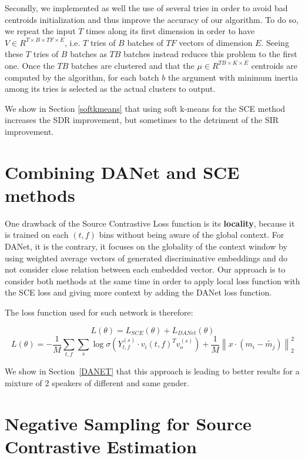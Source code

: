 \documentclass[master,final,11pt]{iscs-thesis}
\newcommand{\norm}[1]{\left\lVert#1\right\rVert}
\begin{document}
Secondly, we implemented as well the use of several tries in order to avoid bad centroids initialization and thus improve the accuracy of our algorithm. To do so, we repeat the input $T$ times along its first dimension in order to have $V\in R^{T \times B\times TF \times E}$, i.e. $T$ tries of $B$ batches of $TF$ vectors of dimension $E$. Seeing these $T$ tries of $B$ batches as $TB$ batches instead reduces this problem to the first one. Once the $TB$ batches are clustered and that the $\mu \in R^{TB\times K \times E}$ centroids are computed by the algorithm, for each batch $b$ the argument with minimum inertia among its tries is selected as the actual clusters to output.

We show in Section \ref{softkmeans} that using soft k-means for the SCE method increases the SDR improvement, but sometimes to the detriment of the SIR improvement.



\section{Combining DANet and SCE methods}

One drawback of the Source Contrastive Loss function is its \textbf{locality}, because it is trained on each $(t,f)$ bins without being aware of the global context. For DANet, it is the contrary, it focuses on the globality of the context window by using weighted average vectors of generated discriminative embeddings and do not consider close relation between each embedded vector.
Our approach is to consider both methods at the same time in order to apply local loss function with the SCE loss and giving more context by adding the DANet loss function.

The loss function used for such network is therefore:

\[L(\theta) = L_{SCE}(\theta) + L_{DANet}(\theta)\]
\[L(\theta) = - \frac{1}{M} \sum_{t,f} \sum_{s} \log \sigma(Y_{t,f}^{(s)} \cdot v_i(t,f)^{T} v_o^{(s)}) + \frac{1}{M} \norm{x \cdot (m_i - \tilde{m_j})}^2_2\]

We show in Section~\ref{DANET} that this approach is leading to better results for a mixture of 2 speakers of different and same gender.


\section{Negative Sampling for Source Contrastive Estimation}
\end{document}

